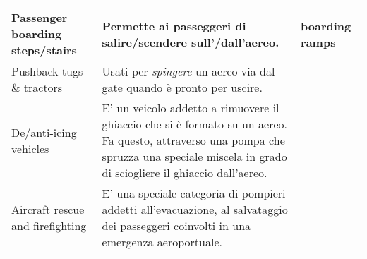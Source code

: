 \begin{landscape}
\begin{table}[htp]
	\centering
	{\small %
		\begin{tabular}{p{}p{}p{}}
			\textsf{\small Passenger boarding steps/stairs} & \textsf{\small Permette ai passeggeri di salire/scendere sull'/dall'aereo.} & \textsf{\small boarding ramps} \\
			\hline
			\textsf{\small Pushback tugs \& tractors} & \textsf{\small Usati per \emph{spingere} un aereo via dal gate quando è pronto per uscire.} & \textsf{\small } \\
			\hline
			\textsf{\small De/anti-icing vehicles} & \textsf{\small E' un veicolo addetto a rimuovere il ghiaccio che si è formato su un aereo. Fa questo, attraverso una pompa che spruzza una speciale miscela in grado di sciogliere il ghiaccio dall'aereo.} & \textsf{\small } \\
			\hline
			\textsf{\small Aircraft rescue and firefighting} & \textsf{\small E' una speciale categoria di pompieri addetti all'evacuazione, al salvataggio dei passeggeri coinvolti in una emergenza aeroportuale.} & \textsf{\small } \\
			\hline
		\end{tabular}%
}%
\end{table}
\end{landscape}

